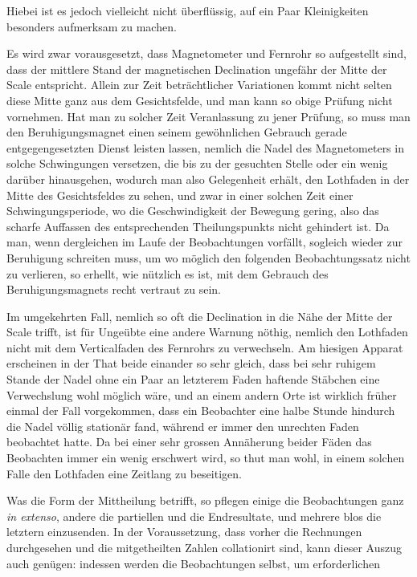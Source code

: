Hiebei ist es jedoch vielleicht nicht überflüssig, auf ein Paar Kleinigkeiten besonders aufmerksam zu machen.

Es wird zwar vorausgesetzt, dass Magnetometer und Fernrohr so aufgestellt sind, dass der mittlere Stand der magnetischen Declination ungefähr der Mitte der Scale entspricht. Allein zur Zeit beträchtlicher Variationen kommt nicht selten diese Mitte ganz aus dem Gesichtsfelde, und man kann so obige Prüfung nicht vornehmen. Hat man zu solcher Zeit Veranlassung zu jener Prüfung, so muss man den Beruhigungsmagnet einen seinem gewöhnlichen Gebrauch gerade entgegengesetzten Dienst leisten lassen, nemlich die Nadel des Magnetometers in solche Schwingungen versetzen, die bis zu der gesuchten Stelle oder ein wenig darüber hinausgehen, wodurch man also Gelegenheit erhält, den Lothfaden in der Mitte des Gesichtsfeldes zu sehen, und zwar in einer solchen Zeit einer Schwingungsperiode, wo die Geschwindigkeit der Bewegung gering, also das scharfe Auffassen des entsprechenden Theilungspunkts nicht gehindert ist. Da man, wenn dergleichen im Laufe der Beobachtungen vorfällt, sogleich wieder zur Beruhigung schreiten muss, um wo möglich den folgenden Beobachtungssatz nicht zu verlieren, so erhellt, wie nützlich es ist, mit dem Gebrauch des Beruhigungsmagnets recht vertraut zu sein.

Im umgekehrten Fall, nemlich so oft die Declination in die Nähe der Mitte der Scale trifft, ist für Ungeübte eine andere Warnung nöthig, nemlich den Lothfaden nicht mit dem Verticalfaden des Fernrohrs zu verwechseln. Am hiesigen Apparat erscheinen in der That beide einander so sehr gleich, dass bei sehr ruhigem Stande der Nadel ohne ein Paar an letzterem Faden haftende Stäbchen eine Verwechslung wohl möglich wäre, und an einem andern Orte ist wirklich früher einmal der Fall vorgekommen, dass ein Beobachter eine halbe Stunde hindurch die Nadel völlig stationär fand, während er immer den unrechten Faden beobachtet hatte. Da bei einer sehr grossen Annäherung beider Fäden das Beobachten immer ein wenig erschwert wird, so thut man wohl, in einem solchen Falle den Lothfaden eine Zeitlang zu beseitigen.

Was die Form der Mittheilung betrifft, so pflegen einige die Beobachtungen ganz \textit{in extenso}, andere die partiellen und die Endresultate, und mehrere blos die letztern einzusenden. In der Voraussetzung, dass vorher die Rechnungen durchgesehen und die mitgetheilten Zahlen collationirt sind, kann dieser Auszug auch genügen: indessen werden die Beobachtungen selbst, um erforderlichen
